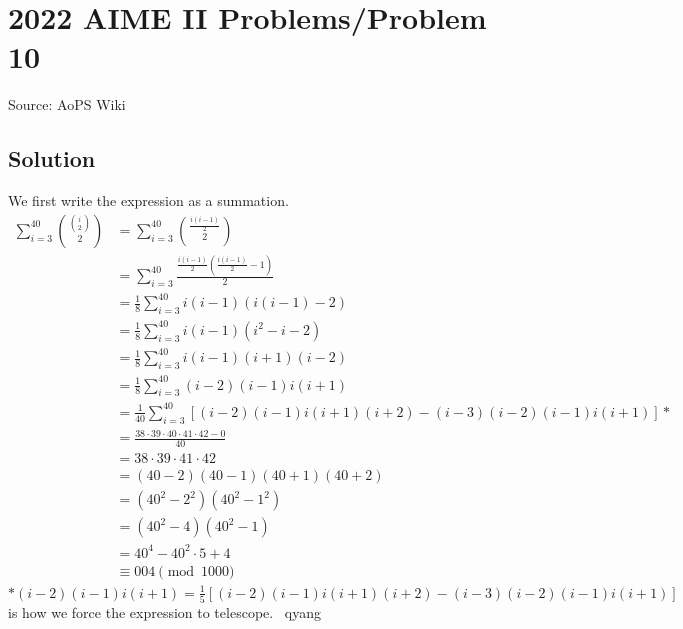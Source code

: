\documentclass[12pt]{article}
\begin{document}
\section*{{2022 AIME II Problems/Problem 10}}
Source: AoPS Wiki

\subsection*{Solution}
We first write the expression as a summation. \begin{align*} \sum_{i=3}^{40} \binom{\binom{i}{2}}{2} & = \sum_{i=3}^{40} \binom{\frac{i \left( i - 1 \right)}{2}}{2} \\ & = \sum_{i=3}^{40} \frac{\frac{i \left( i - 1 \right)}{2} \left( \frac{i \left( i - 1 \right)}{2}- 1 \right)}{2} \\ & = \frac{1}{8} \sum_{i=3}^{40} i \left( i - 1 \right) \left( i \left( i - 1 \right) - 2 \right) \\ & = \frac{1}{8} \sum_{i=3}^{40} i(i - 1)(i^2-i-2) \\ & = \frac{1}{8} \sum_{i=3}^{40} i(i-1)(i+1)(i-2) \\ & = \frac{1}{8}\sum_{i=3}^{40} (i-2)(i-1)i(i+1) \\ & = \frac{1}{40}\sum_{i=3}^{40}[(i-2)(i-1)i(i+1)(i+2)-(i-3)(i-2)(i-1)i(i+1)]* \\ & = \frac{38\cdot39\cdot40\cdot41\cdot42-0}{40}\\ & = 38 \cdot 39 \cdot 41 \cdot 42 \\ & = \left( 40 - 2 \right) \left( 40 - 1 \right) \left( 40 + 1 \right) \left( 40 + 2 \right) \\ & = \left( 40^2 - 2^2 \right) \left( 40^2 - 1^2 \right) \\ & = \left( 40^2 - 4 \right) \left( 40^2 - 1 \right) \\ & = 40^4 - 40^2 \cdot 5 + 4 \\ & \equiv \boxed{004}\pmod{1000}\ \end{align*} $*(i-2)(i-1)i(i+1)=\frac{1}{5}[(i-2)(i-1)i(i+1)(i+2)-(i-3)(i-2)(i-1)i(i+1)]$ is how we force the expression to telescope.
~qyang
\end{document}
